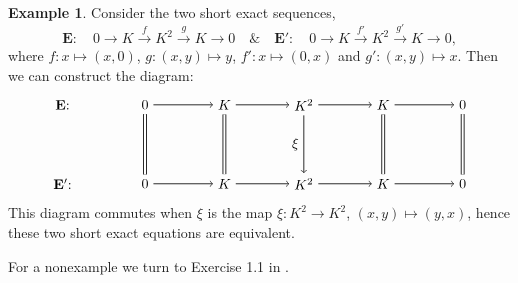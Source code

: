 \documentclass[11.5pt, twoside, a4paper, titlepage]{report}
\theoremstyle{definition}
\newtheorem{eg}[mydef]{Example}
\theoremstyle{plain}
\begin{document}
\begin{eg}
Consider the two short exact sequences, 
\begin{equation*}
\mathbf{E}: \quad 0\xrightarrow{}K\xrightarrow{f}K^2\xrightarrow{g}K\xrightarrow{}0  \quad \& \quad \mathbf{E'}: \quad 0\xrightarrow{}K\xrightarrow{f'}K^2\xrightarrow{g'}K\xrightarrow{}0 ,
\end{equation*}
where $f: x \mapsto (x, 0)$, $g: (x,y)\mapsto y$, $f':x \mapsto (0,x)$ and $g':(x,y)\mapsto x$. Then we can construct the diagram: 
\begin{equation*}
\begin{tikzpicture}[->,-latex, auto, main path/.style={->, semithick}, main node/.style={}]
\node	[main node]		(1) at (0,0)		{$\mathbf{E}$: \quad };
\node	[main node]		(2) at (2,0)		{$0$};
\node	[main node]		(3) at (4,0)		{$K$};
\node [main node]		(4) at (6,0)		{$K^2$};
\node [main node]		(5) at (8,0)		{$K$};
\node	[main node]		(11) at (10,0)	{$0$};

\node	[main node]		(6) at (0,-2)		{$\mathbf{E'}$: \quad};
\node	[main node]		(7) at (2,-2)		{$0$};
\node	[main node]		(8) at (4,-2)		{$K$};
\node [main node]		(9) at (6,-2)		{$K^2$};
\node [main node]		(10) at (8,-2)	{$K$};
\node [main node]		(13) at (10,-2)	{$0$};



\draw (2) edge [main path] node [auto] {$$} (3);
\draw (3) edge [main path] node [auto] {$$} (4);
\draw (4) edge [main path] node [auto] {$$} (5);
\draw (5) edge [main path] (11);


\draw (7) edge [main path] node [auto] {$$} (8);
\draw (8) edge [main path] node [auto] {$$} (9);
\draw (9) edge [main path] node [auto] {$$} (10);
\draw (10) edge [main path] (13);

\draw (3) edge [-, semithick, double, double distance=1.5pt] (8);
\draw (4) edge [main path] node [auto, swap] {$\xi$} (9);
\draw (5) edge [-, semithick, double, double distance=1.5pt](10);
\draw (11) edge [-, semithick, double, double distance=1.5pt] (13);
\draw (2) edge [-, semithick, double, double distance=1.5pt] (7);
\end{tikzpicture}
\end{equation*}
This diagram commutes when $\xi$ is the map $\xi: K^2 \to K^2$, $(x, y) \mapsto (y, x)$, hence these two short exact equations are equivalent.
\end{eg}

For a nonexample we turn to Exercise \uppercase\expandafter{} 1.1 in \cite{Stamm}.
\end{document}

